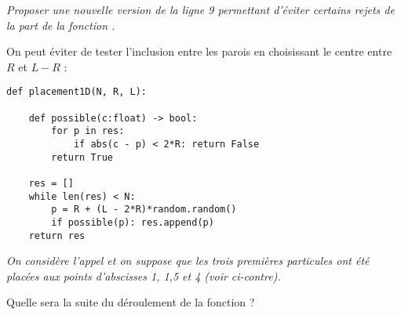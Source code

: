 \begin{Exercise}[label = {Q:éviter les bords}]\it 
Proposer une nouvelle version de la ligne 9 permettant d'éviter certains rejets de la part de la fonction .
\end{Exercise}
\begin{Answer} On peut éviter de tester l'inclusion entre les parois en choisissant le centre entre $R$ et $L-R$ :
\begin{lstlisting}
def placement1D(N, R, L):
    
    def possible(c:float) -> bool:
        for p in res:
            if abs(c - p) < 2*R: return False
        return True
    
    res = []
    while len(res) < N:
        p = R + (L - 2*R)*random.random()
        if possible(p): res.append(p)
    return res
\end{lstlisting}
\end{Answer}
\begin{minipage}{0.6\textwidth}
\begin{Exercise}[label = {Q:blocage}]\it 
On considère l'appel  et on suppose que les trois premières particules ont été placées aux points d'abscisses 1, 1,5 et 4 (voir ci-contre). 

Quelle sera la suite du déroulement de la fonction  ?
\end{Exercise}
\end{minipage}
\begin{minipage}{0.4\textwidth}
\begin{center}
\end{center}
\end{minipage}
